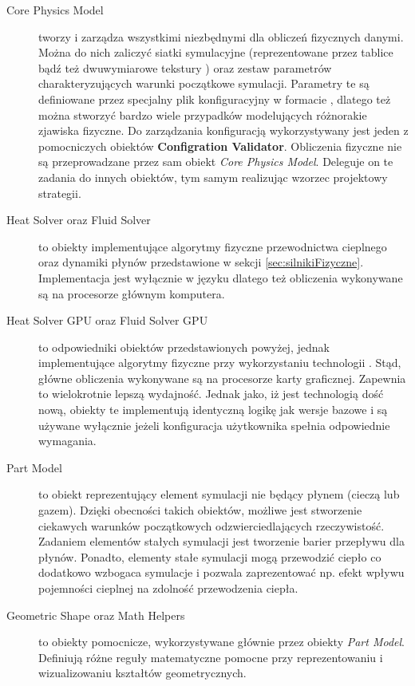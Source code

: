 \begin{description}

\item[Core Physics Model] tworzy i zarządza wszystkimi niezbędnymi dla obliczeń
fizycznych danymi. Można do nich zaliczyć siatki symulacyjne (reprezentowane
przez tablice \js bądź też dwuwymiarowe tekstury ) oraz zestaw
parametrów charakteryzujących warunki początkowe symulacji. Parametry te są
definiowane przez specjalny plik konfiguracyjny w formacie , dlatego
też można stworzyć bardzo wiele przypadków modelujących różnorakie zjawiska
fizyczne. Do zarządzania konfiguracją wykorzystywany jest jeden z pomocniczych
obiektów \textbf{Configration Validator}. Obliczenia fizyczne nie są
przeprowadzane przez sam obiekt \emph{Core Physics Model}. Deleguje on te
zadania do innych obiektów, tym samym realizując wzorzec projektowy strategii.

\item[Heat Solver oraz Fluid Solver] to obiekty implementujące algorytmy
fizyczne przewodnictwa cieplnego oraz dynamiki płynów przedstawione w sekcji
\ref{sec:silnikiFizyczne}. Implementacja jest wyłącznie w języku \js dlatego też
obliczenia wykonywane są na procesorze głównym komputera.

\item[Heat Solver GPU oraz Fluid Solver GPU] to odpowiedniki obiektów
przedstawionych powyżej, jednak implementujące algorytmy fizyczne przy
wykorzystaniu technologii . Stąd, główne obliczenia wykonywane są na
procesorze karty graficznej. Zapewnia to wielokrotnie lepszą wydajność. Jednak
jako, iż  jest technologią dość nową, obiekty te implementują
identyczną logikę jak wersje bazowe i są używane wyłącznie jeżeli konfiguracja
użytkownika spełnia odpowiednie wymagania.

\item[Part Model] to obiekt reprezentujący element symulacji nie będący płynem
(cieczą lub gazem). Dzięki obecności takich obiektów, możliwe jest stworzenie
ciekawych warunków początkowych odzwierciedlających rzeczywistość.  Zadaniem
elementów stałych symulacji jest tworzenie barier przepływu dla płynów. Ponadto,
elementy stałe symulacji mogą przewodzić ciepło co dodatkowo wzbogaca symulacje
i pozwala zaprezentować np. efekt wpływu pojemności cieplnej na zdolność
przewodzenia ciepła.

\item[Geometric Shape oraz Math Helpers] to obiekty pomocnicze, wykorzystywane
głównie przez obiekty \emph{Part Model}. Definiują różne reguły matematyczne
pomocne przy reprezentowaniu i wizualizowaniu kształtów geometrycznych.

\end{description}

